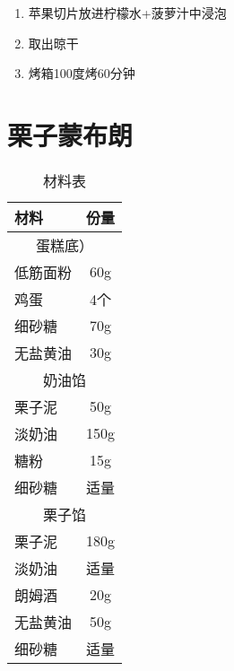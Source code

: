 \begin{enumerate}
    \item 苹果切片放进柠檬水+菠萝汁中浸泡
    \item 取出晾干
    \item 烤箱100度烤60分钟
\end{enumerate}



\section{栗子蒙布朗}

\begin{table}[h]
    \centering
    \begin{tabular}{|l||c|}\hline
     \textbf{材料}    &  \textbf{份量}\\ \hline\hline
    \multicolumn{2}{|c|}{蛋糕底）}\\ \hline
    低筋面粉 & 60g \\ \hline
    鸡蛋 & 4个 \\ \hline
    细砂糖 & 70g \\ \hline
    无盐黄油 & 30g \\ \hline
    \multicolumn{2}{|c|}{奶油馅}\\ \hline
    栗子泥     &  50g \\ \hline
    淡奶油     &  150g \\ \hline
    糖粉 &  15g \\ \hline
    细砂糖 & 适量 \\ \hline
    \multicolumn{2}{|c|}{栗子馅}\\ \hline
    栗子泥     &  180g \\ \hline
    淡奶油     &  适量 \\ \hline
    朗姆酒     &  20g \\ \hline
    无盐黄油  & 50g \\ \hline
    细砂糖 & 适量 \\ \hline
    \end{tabular}
    \caption{材料表}
\end{table}

